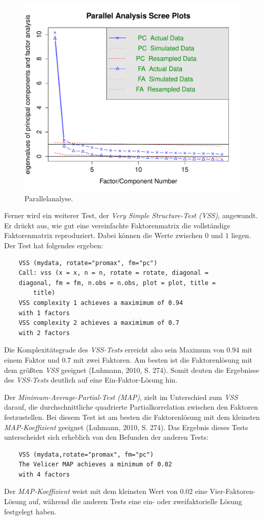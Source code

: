 \documentclass[12pt,a4paper]{article}
\begin{document}
\begin{figure}[h]
\centering
\includegraphics[scale=0.75]{../R-Berechnungen/Rplot02.pdf}
\caption{Parallelanalyse.}
\label{fig_para}
\end{figure}

Ferner wird ein weiterer Test, der \textit{Very Simple Structure-Test (VSS)}, angewandt. Er drückt aus, wie gut eine vereinfachte Faktorenmatrix die vollständige Faktorenmatrix reproduziert. Dabei können die Werte zwischen $0$ und $1$ liegen. Der Test hat folgendes ergeben:
\begin{verbatim}
	VSS (mydata, rotate="promax", fm="pc")
	Call: vss (x = x, n = n, rotate = rotate, diagonal = 
	diagonal, fm = fm, n.obs = n.obs, plot = plot, title = 
		title)
	VSS complexity 1 achieves a maximimum of 0.94 
	with 1 factors
	VSS complexity 2 achieves a maximimum of 0.7 
	with 2 factors
	\end{verbatim}
\noindent Die Komplexitätsgrade des \textit{VSS-Tests} erreicht also sein Maximum von $0.94$ mit einem Faktor und $0.7$ mit zwei Faktoren. Am besten ist die Faktorenlösung mit dem größten \textit{VSS} geeignet (Luhmann, 2010, S. 274). Somit deuten die Ergebnisse des \textit{VSS-Tests} deutlich auf eine Ein-Faktor-Lösung hin.

	Der \textit{Minimum-Average-Partial-Test (MAP)}, zielt im Unterschied zum \textit{VSS} darauf, die durchschnittliche quadrierte Partialkorrelation zwischen den Faktoren festzustellen.  Bei diesem Test ist am besten die Faktorenlösung mit dem kleinsten \textit{MAP-Koeffizient} geeignet (Luhmann, 2010, S. 274). Das Ergebnis dieses Tests unterscheidet sich erheblich von den Befunden der anderen Tests:
	\begin{verbatim}
	VSS (mydata,rotate="promax", fm="pc")
	The Velicer MAP achieves a minimum of 0.02 
	with 4 factors
	\end{verbatim}
\noindent Der \textit{MAP-Koeffizient} weist mit dem kleinsten Wert von $0.02$ eine Vier-Faktoren-Lösung auf, während die anderen Tests eine ein- oder zweifaktorielle Lösung festgelegt haben.
\end{document}
